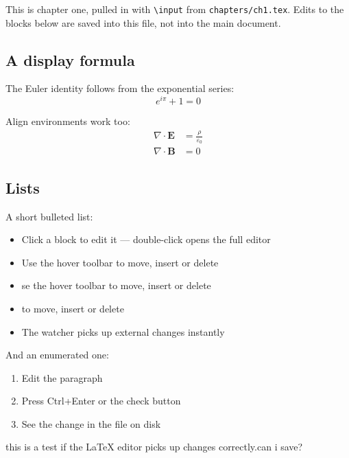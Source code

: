This is chapter one, pulled in with \texttt{\textbackslash input} from
\texttt{chapters/ch1.tex}. Edits to the blocks below are saved into this
file, not into the main document.

\subsection{A display formula}

The Euler identity follows from the exponential series:
\begin{equation}
  e^{i\pi} + 1 = 0
\end{equation}

Align environments work too:
\begin{align}
  \nabla \cdot \mathbf{E} &= \frac{\rho}{\varepsilon_0} \\
  \nabla \cdot \mathbf{B} &= 0
\end{align}


\subsection{Lists}

A short bulleted list:

\begin{itemize}\item Click a block to edit it --- double-click opens the full editor
\item Use the hover toolbar to move, insert or delete
\item se the hover toolbar to move, insert or delete
\item to move, insert or delete
\item The watcher picks up external changes instantly
\end{itemize}

And an enumerated one:

\begin{enumerate}
  \item Edit the paragraph
  \item Press Ctrl+Enter or the check button
  \item See the change in the file on disk
\end{enumerate}

this is a test if the LaTeX editor picks up changes correctly.can i save?















